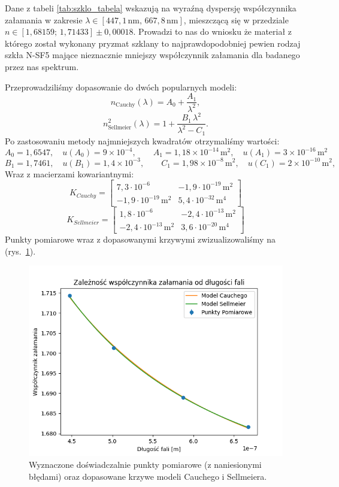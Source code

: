 \documentclass[12pt]{article}
\begin{document}
Dane z tabeli \ref{tab:szklo_tabela} wskazują na wyraźną dyspersję współczynnika załamania w zakresie $\lambda \in [447{,}1\,\mathrm{nm},\,667{,}8\,\mathrm{nm}]$, mieszczącą się w przedziale $n \in [1{,}68159;\,1{,}71433] \pm 0{,}00018$.  
Prowadzi to nas do wniosku że materiał z którego został wykonany pryzmat szklany to najprawdopodobniej pewien rodzaj szkła N-SF5 mające nieznacznie mniejszy współczynnik załamania \cite{szklo} dla badanego przez nas spektrum.

Przeprowadziliśmy dopasowanie do dwóch popularnych modeli:  
\[
    n_{\mathrm{Cauchy}}(\lambda) = A_0 + \frac{A_1}{\lambda^2}, 
\]
\[
    n_{\mathrm{Sellmeier}}^2(\lambda) = 1 + \frac{B_1\,\lambda^2}{\lambda^2 - C_1}.
\]
Po zastosowaniu metody najmniejszych kwadratów otrzymaliśmy wartości:
\[
    A_0 = 1{,}6547,\quad u(A_0) = 9\times 10^{-4}, \qquad A_1 = 1{,}18\times 10^{-14}\,\mathrm{m^2}, \quad u(A_1) = 3 \times 10^{-16}\,\mathrm{m^2}
\]
\[
    B_1 = 1{,}7461,\quad u(B_1) = 1{,}4\times 10^{-3},\qquad C_1 = 1{,}98\times 10^{-8}\,\mathrm{m^2},\quad u(C_1) = 2\times 10^{-10}\,\mathrm{m^2},
\]
Wraz z macierzami kowariantnymi:
\[
    K_{Cauchy} = \begin{bmatrix}
        7{,}3 \cdot 10^{-6} & -1{,}9 \cdot 10^{-19} \, \mathrm{m^2} \\
        -1{,}9 \cdot 10^{-19} \, \mathrm{m^2} & 5{,}4 \cdot 10^{-32} \, \mathrm{m^4}
    \end{bmatrix}
\]
\[
    K_{Sellmeier} = \begin{bmatrix}
        1{,}8 \cdot 10^{-6} & -2{,}4 \cdot 10^{-13} \, \mathrm{m^2} \\
        -2{,}4 \cdot 10^{-13} \, \mathrm{m^2} & 3{,}6 \cdot 10^{-20} \, \mathrm{m^4}
    \end{bmatrix}
\]
Punkty pomiarowe wraz z dopasowanymi krzywymi zwizualizowaliśmy na (rys.~\ref{fig:wykres}).

\begin{figure}[H]
    \centering
    \includegraphics[scale=0.9]{wykres}
    \caption{Wyznaczone doświadczalnie punkty pomiarowe (z naniesionymi błędami) oraz dopasowane krzywe modeli Cauchego i Sellmeiera.}
    \label{fig:wykres}
\end{figure}
\end{document}
